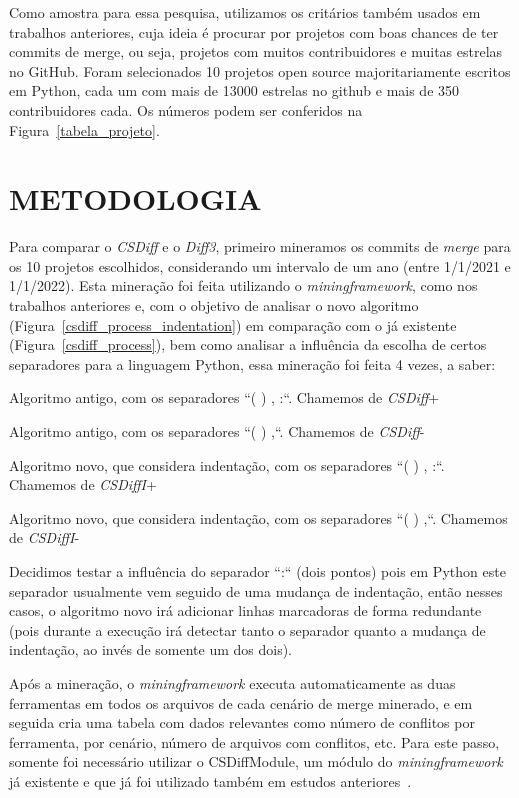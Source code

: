 Como amostra para essa pesquisa, utilizamos os critários também usados em
trabalhos anteriores, cuja ideia é procurar por projetos com boas chances de
ter commits de merge, ou seja, projetos com muitos contribuidores e muitas
estrelas no GitHub. Foram selecionados 10 projetos open source majoritariamente
escritos em Python, cada um com mais de 13000 estrelas no github e mais de 350
contribuidores cada. Os números podem ser conferidos na
Figura~\ref{tabela_projeto}.

\section{METODOLOGIA}\label{metodologia}

Para comparar o \emph{CSDiff} e o \emph{Diff3}, primeiro mineramos os commits
de \emph{merge} para os 10 projetos escolhidos, considerando um intervalo de um
ano (entre 1/1/2021 e 1/1/2022). Esta mineração foi feita utilizando o
\emph{miningframework}, como nos trabalhos anteriores e, com o objetivo de analisar o
novo algoritmo (Figura~\ref{csdiff_process_indentation}) em comparação com o já
existente (Figura~\ref{csdiff_process}), bem como analisar a influência da
escolha de certos separadores para a linguagem Python, essa mineração foi feita
4 vezes, a saber:

\begin{compactenum}[(1)]
	\item Algoritmo antigo, com os separadores ``( ) , :``. Chamemos de \emph{CSDiff}+
	\item Algoritmo antigo, com os separadores ``( ) ,``. Chamemos de \emph{CSDiff}-
	\item Algoritmo novo, que considera indentação, com os separadores ``( ) , :``. Chamemos de \emph{CSDiffI}+
	\item Algoritmo novo, que considera indentação, com os separadores ``( ) ,``. Chamemos de \emph{CSDiffI}-
\end{compactenum}

Decidimos testar a influência do separador ``:`` (dois pontos) pois em Python
este separador usualmente vem seguido de uma mudança de indentação, então
nesses casos, o algoritmo novo irá adicionar linhas marcadoras de forma
redundante (pois durante a execução irá detectar tanto o separador quanto a
mudança de indentação, ao invés de somente um dos dois).

Após a mineração, o \emph{miningframework} executa automaticamente as duas
ferramentas em todos os arquivos de cada cenário de merge minerado, e em
seguida cria uma tabela com dados relevantes como número de conflitos por
ferramenta, por cenário, número de arquivos com conflitos, etc. Para este
passo, somente foi necessário utilizar o CSDiffModule, um módulo do
\emph{miningframework} já existente e que já foi utilizado também em estudos
anteriores~\cite{heitor21}.

